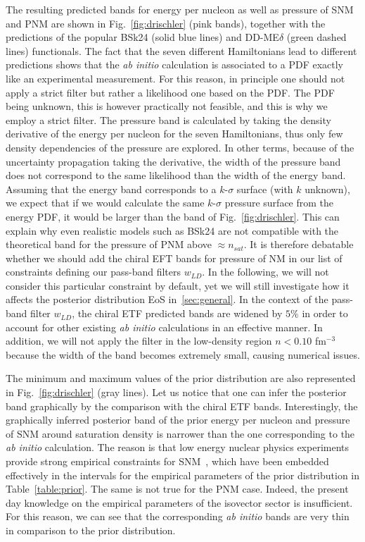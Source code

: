 The resulting predicted bands for energy per nucleon as well as pressure of SNM
and PNM are shown in Fig.~\ref{fig:drischler} (pink bands), together with 
the predictions of the popular BSk24 (solid blue lines) and DD-ME$\delta$ 
(green dashed lines) functionals. 
The fact that the seven different Hamiltonians lead to different predictions
shows that the \textit{ab initio} calculation is associated to a PDF exactly 
like an experimental measurement. 
For this reason, in principle one should not apply a
strict filter but rather a likelihood one based on the PDF. The PDF being
unknown, this is however practically not feasible, and this is why we employ a
strict filter. 
The pressure band is calculated by taking the density derivative of the energy 
per nucleon for the seven Hamiltonians, thus only few density dependencies of 
the pressure are explored. 
%
In other terms, because of the uncertainty propagation taking the derivative, 
the width of the pressure band does not correspond to the same likelihood than 
the width of the energy band. Assuming that the energy band corresponds to a 
$k$-$\sigma$ surface (with $k$ unknown), we expect that if we would calculate 
the same $k$-$\sigma$ pressure surface from the energy PDF, it would be larger 
than the band of Fig.~\ref{fig:drischler}. 
%
This can explain why even realistic models such as 
BSk24 are not compatible with the theoretical band for the 
pressure of PNM above $\approx n_{sat}$. It is therefore debatable whether 
we should add the chiral EFT bands for pressure of NM in our list of
constraints defining our pass-band filters $w_{LD}$. In the following, we will 
not consider this particular constraint by default, yet we will still 
investigate how it affects the posterior distribution EoS in~\ref{sec:general}.
In the context of the pass-band filter $w_{LD}$, the chiral ETF predicted 
bands are widened by $5\%$ in order to account for other 
existing \textit{ab initio} calculations in an effective manner. 
In addition, we will not apply the filter 
in the low-density region $n < 0.10$ fm$^{-3}$ because the width of the band 
becomes extremely small, causing numerical issues. 

The minimum and maximum values of the prior distribution are also
represented in Fig.~\ref{fig:drischler} (gray lines). Let us notice that one 
can infer the posterior band graphically by the comparison with the chiral 
ETF bands. Interestingly, the graphically inferred posterior band of the 
prior energy per nucleon and pressure of SNM around saturation density is 
narrower than the one corresponding to the \textit{ab initio} calculation. 
The reason is that low energy nuclear physics experiments provide strong 
empirical constraints for SNM~\cite{Margueron2018a}, which have been embedded 
effectively in the intervals for the empirical parameters of the prior
distribution in Table~\ref{table:prior}. The same is not true for the PNM case. 
Indeed, the present day knowledge on the empirical parameters of the 
isovector sector is insufficient. For this reason, we can see that the 
corresponding \textit{ab initio} bands are very thin in comparison to the prior 
distribution.

